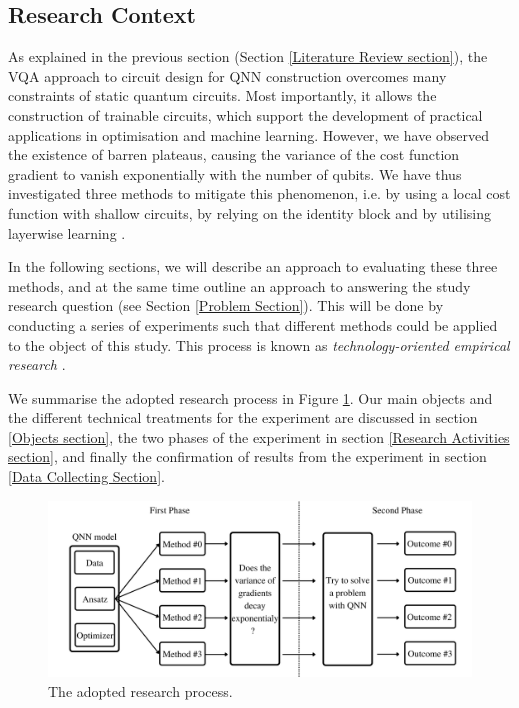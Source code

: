 \subsection{Research Context}

As explained in the previous section (Section \ref{Literature Review section}), the VQA approach to circuit design for QNN construction overcomes many constraints of static quantum circuits. Most importantly, it allows the construction of trainable circuits, which support the development of practical applications in optimisation and machine learning.
However, we have observed the existence of barren plateaus, causing the variance of the cost function gradient to vanish exponentially with the number of qubits.
We have thus investigated three methods to mitigate this phenomenon, i.e. by using a local cost function with shallow circuits, by relying on the identity block and by utilising layerwise learning \cite{cerezoCostFunctionDependent2021, liuParameterInitializationMethod2021, skolikLayerwiseLearningQuantum2021}.

In the following sections, we will describe an approach to evaluating these three methods, and at the same time outline an approach to answering the study research question (see Section \ref{Problem Section}). This will be done by conducting a series of experiments such that different methods could be applied to the object of this study.
This process is known as \emph{technology-oriented empirical research} \cite[sect 2.4]{wohlinExperimentationSoftwareEngineering2012}.

We summarise the adopted research process in Figure \ref{Research Activities Figure}.
Our main objects and the different technical treatments for the experiment are discussed in section \ref{Objects section}, the two phases of the experiment in section \ref{Research Activities section}, and finally the confirmation of results from the experiment in section \ref{Data Collecting Section}.

\begin{figure}
    \centering
    \includegraphics[width=\linewidth]{./ResearchDesign/Appendices/ExperimentDiagram.png}
    \caption{
        The adopted research process.
    }
    \label{Research Activities Figure}
\end{figure}
